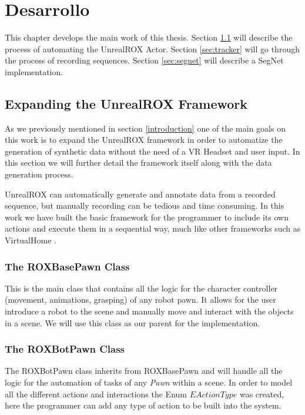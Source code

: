 
\chapter{Desarrollo}
\label{desarrollo}
This chapter develops the main work of this thesis. Section \ref{sec:expanding} will describe the process of automating the UnrealROX Actor. Section \ref{sec:tracker} will go through the process of recording sequences. Section \ref{sec:segnet} will describe a  SegNet implementation.  

\section{Expanding the UnrealROX Framework}
\label{sec:expanding}
As we previously mentioned in section \ref{introduction} one of the main goals on this work is to expand the UnrealROX framework in order to automatize the generation of synthetic data without the need of a VR Headset and user input. In this section we will further detail the framework itself along with the data generation process.

UnrealROX can automatically generate and annotate data from a recorded sequence, but manually recording can be tedious and time consuming. In this work we have built the basic framework for the programmer to include its own actions and execute them in a sequential way, much like other frameworks such as VirtualHome \cite{virtualhome2018}. 

\subsection{The ROXBasePawn Class}
This is the main class that contains all the logic for the character controller (movement, animations, grasping) of any robot pawn. It allows for the user introduce a robot to the scene and manually move and interact with the objects in a scene. We will use this class as our parent for the implementation.

\subsection{The ROXBotPawn Class}
The ROXBotPawn class inherits from ROXBasePawn and will handle all the logic for the automation of tasks of any \textit{Pawn} within a scene. In order to model all the different actions and interactions the Enum $EActionType$ was created, here the programmer can add any type of action to be built into the system.

